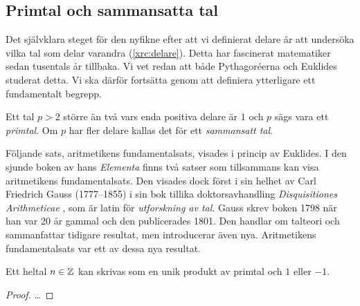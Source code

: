 \subsection{Primtal och sammansatta tal}
Det självklara steget för den nyfikne efter att vi definierat delare är att 
undersöka vilka tal som delar varandra (\cref{xrc:delare}).
Detta har fascinerat matematiker sedan tusentals år tillbaka.
Vi vet redan att både Pythagoréerna och Euklides studerat detta.
Vi ska därför fortsätta genom att definiera ytterligare ett fundamentalt 
begrepp.
\begin{definition}
  Ett tal \(p > 2\) större än två vars enda positiva delare är \(1\) och \(p\) 
  sägs vara ett \emph{primtal}.
  Om \(p\) har fler delare kallas det för ett \emph{sammansatt tal}.
\end{definition}

Följande sats, aritmetikens fundamentalsats, visades i princip av Euklides.
I den sjunde boken av hans \emph{Elementa} finns två satser som tillsammans
kan visa aritmetikens fundamentalsats.
Den visades dock först i sin helhet av Carl Friedrich Gauss (1777--1855) i sin
bok tillika doktorsavhandling \emph{Disquisitiones Arithmeticae} 
\cite{Kline1990mtf3}, som är latin för \emph{utforskning av
tal}.
Gauss skrev boken 1798 när han var 20 år gammal och den publicerades 1801.
Den handlar om talteori och sammanfattar tidigare resultat, men introducerar
även nya.
Aritmetikens fundamentalsats var ett av dessa nya resultat.
\begin{theorem}\label{thm:AritmetikensFundamentalsats}
  Ett heltal \(n\in\mathbb{Z}\) kan skrivas som en unik produkt av primtal och \(1\)
  eller \(-1\).
\end{theorem}
\begin{proof}
  \dots
\end{proof}

